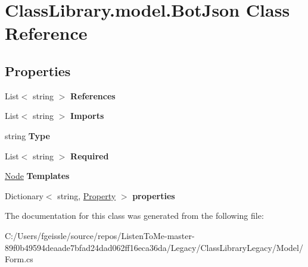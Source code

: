 \hypertarget{class_class_library_1_1model_1_1_bot_json}{}\section{Class\+Library.\+model.\+Bot\+Json Class Reference}
\label{class_class_library_1_1model_1_1_bot_json}
\subsection*{Properties}
\begin{DoxyCompactItemize}
\item 
\mbox{\label{class_class_library_1_1model_1_1_bot_json_a91550ddb24b54dc4b48ad598dd0cd6bb}} 
List$<$ string $>$ {\bfseries References}
\item 
\mbox{\label{class_class_library_1_1model_1_1_bot_json_a37d67a6ef65858d3e63ce3bd91966119}} 
List$<$ string $>$ {\bfseries Imports}
\item 
\mbox{\label{class_class_library_1_1model_1_1_bot_json_a3701ef93ed4948a7607c7e661a308222}} 
string {\bfseries Type}
\item 
\mbox{\label{class_class_library_1_1model_1_1_bot_json_a76ffb41b6617ff0fd05b8c594752b903}} 
List$<$ string $>$ {\bfseries Required}
\item 
\mbox{\label{class_class_library_1_1model_1_1_bot_json_a0c17a49de2588b397a8455bebaca27d0}} 
\mbox{\hyperlink{class_class_library_1_1model_1_1_node}{Node}} {\bfseries Templates}
\item 
\mbox{\label{class_class_library_1_1model_1_1_bot_json_ad8a7686a022349331af050c89488b2d1}} 
Dictionary$<$ string, \mbox{\hyperlink{class_class_library_1_1model_1_1_property}{Property}} $>$ {\bfseries properties}
\end{DoxyCompactItemize}


The documentation for this class was generated from the following file\+:\begin{DoxyCompactItemize}
\item 
C\+:/\+Users/fgeissle/source/repos/\+Listen\+To\+Me-\/master-\/89f0b49594deaade7bfad24dad062ff16eca36da/\+Legacy/\+Class\+Library\+Legacy/\+Model/Form.\+cs\end{DoxyCompactItemize}
